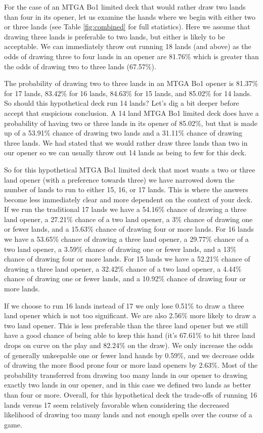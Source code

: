 \documentclass[oneside]{book}   %
\begin{document}
For the case of an MTGA Bo1 limited deck that would rather draw two lands than four in its opener, let us examine the hands where we begin with either two or three lands (see Table \ref{fig:combined} for full statistics). Here we assume that drawing three lands is preferable to two lands, but either is likely to be acceptable. We can immediately throw out running 18 lands (and above) as the odds of drawing three to four lands in an opener are 81.76\% which is greater than the odds of drawing two to three lands (67.57\%). 

The probability of drawing two to three lands in an MTGA Bo1 opener is 81.37\% for 17 lands, 83.42\% for 16 lands, 84.63\% for 15 lands, and 85.02\% for 14 lands. So should this hypothetical deck run 14 lands? Let's dig a bit deeper before accept that suspicious conclusion. A 14 land MTGA Bo1 limited deck does have a probability of having two or three lands in its opener of 85.02\%, but that is made up of a 53.91\% chance of drawing two lands and a 31.11\% chance of drawing three lands. We had stated that we would rather draw three lands than two in our opener so we can usually throw out 14 lands as being to few for this deck. 

So for this hypothetical MTGA Bo1 limited deck that most wants a two or three land opener (with a preference towards three) we have narrowed down the number of lands to run to either 15, 16, or 17 lands. This is where the answers become less immediately clear and more dependent on the context of your deck. If we run the traditional 17 lands we have a 54.16\% chance of drawing a three land opener, a 27.21\% chance of a two land opener, a 3\% chance of drawing one or fewer lands, and a 15.63\% chance of drawing four or more lands. For 16 lands we have a 53.65\% chance of drawing a three land opener, a 29.77\% chance of a two land opener, a 3.59\% chance of drawing one or fewer lands, and a 13\% chance of drawing four or more lands. For 15 lands we have a 52.21\% chance of drawing a three land opener, a 32.42\% chance of a two land opener, a 4.44\% chance of drawing one or fewer lands, and a 10.92\% chance of drawing four or more lands.

If we choose to run 16 lands instead of 17 we only lose 0.51\% to draw a three land opener which is not too significant. We are also 2.56\% more likely to draw a two land opener. This is less preferable than the three land opener but we still have a good chance of being able to keep this hand (it's 67.61\% to hit three land drops on curve on the play and 82.24\% on the draw). We only increase the odds of generally unkeepable one or fewer land hands by 0.59\%, and we decrease odds of drawing the more flood prone four or more land openers by 2.63\%. Most of the probability transferred from drawing too many lands in our opener to drawing exactly two lands in our opener, and in this case we defined two lands as better than four or more. Overall, for this hypothetical deck the trade-offs of running 16 lands versus 17 seem relatively favorable when considering the decreased likelihood of drawing too many lands and not enough spells over the course of a game.
\end{document}
